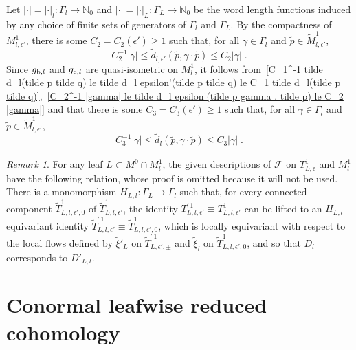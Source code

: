 \documentclass{memo-l}
\theoremstyle{plain}
\theoremstyle{definition}
\theoremstyle{remark}
\newtheorem{rem}[thm]{Remark}
\newcommand{\N}{\mathbb{N}}
\newcommand{\FF}{\mathcal{F}}
\numberwithin{section}{chapter}
\numberwithin{equation}{section}%
\begin{document}
Let $|{\cdot}|=|{\cdot}|_l:\Gamma_l\to\N_0$ and $|{\cdot}|=|{\cdot}|_L:\Gamma_L\to\N_0$ be the word length functions induced by any choice of finite sets of generators of $\Gamma_l$ and $\Gamma_L$. By the compactness of $M^1_{l,\epsilon'}$, there is some $C_2=C_2(\epsilon')\ge1$ such that, for all $\gamma\in\Gamma_l$ and $\tilde p\in\widetilde M^1_{l,\epsilon'}$,
\begin{equation}\label{C_2^-1 |gamma| le tilde d_l epsilon'(tilde p gamma . tilde p) le C_2 |gamma|}
C_2^{-1}|\gamma|\le \tilde d_{l,\epsilon'}(\tilde p,\gamma\cdot\tilde p)\le C_2|\gamma|\;.
\end{equation}
Since $g_{\text{\rm b},l}$ and $g_{\text{\rm c},l}$ are quasi-isometric on $M^1_l$, it follows from~\eqref{C_1^-1 tilde d_l(tilde p tilde q) le tilde d_l epsilon'(tilde p tilde q) le C_1 tilde d_l(tilde p tilde q)},~\eqref{C_2^-1 |gamma| le tilde d_l epsilon'(tilde p gamma . tilde p) le C_2 |gamma|} and  that there is some $C_3=C_3(\epsilon')\ge1$ such that, for all $\gamma\in\Gamma_l$ and $\tilde p\in\widetilde M^1_{l,\epsilon'}$,
\begin{equation}\label{C_3^-1 |gamma| le tilde d_l(tilde p gamma . tilde p) le C_3 |gamma|}
C_3^{-1}|\gamma|\le \tilde d_l(\tilde p,\gamma\cdot\tilde p)\le C_3|\gamma|\;.
\end{equation}

\begin{rem}\label{r: relation between the descriptions}
For any leaf $L\subset M^0\cap\overline{M^1_l}$, the given descriptions of $\FF$ on $T^1_{L,\epsilon}$ and $M^1_l$ have the following relation, whose proof is omitted because it will not be used. There is a monomorphism $H_{L,l}:\Gamma_L\to\Gamma_l$ such that, for every connected component $\widetilde T^1_{L,l,\epsilon',0}$ of $\widetilde T^1_{L,l,\epsilon'}$, the identity $T^{\prime\,1}_{L,l,\epsilon'}\equiv T^1_{L,l,\epsilon'}$ can be lifted to an $H_{L,l}$-equivariant identity $\widetilde T^{\prime\,1}_{L,l,\epsilon'}\equiv\widetilde T^1_{L,l,\epsilon',0}$, which is locally equivariant with respect to the local flows defined by $\tilde\xi'_L$ on $\widetilde T^{\prime\,1}_{L,\epsilon',\pm}$ and $\tilde\xi_l$ on $\widetilde T^1_{L,l,\epsilon',0}$, and so that $D_l$ corresponds to $D'_{L,l}$.
\end{rem}


\chapter{Conormal leafwise reduced cohomology}\label{ch: conormal}
\end{document}
